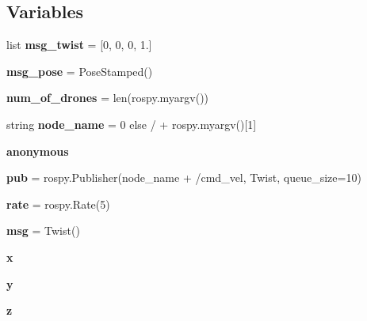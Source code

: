 \subsection*{Variables}
\begin{DoxyCompactItemize}
\item 
\mbox{\label{namespacequadrotor__driver_a0b593d1d89053fdbb65ef11a4523eb77}} 
list {\bfseries msg\+\_\+twist} = \mbox{[}0, 0, 0, 1.\mbox{]}
\item 
\mbox{\label{namespacequadrotor__driver_adfe56e718f228b150e3d4a4654d8d603}} 
{\bfseries msg\+\_\+pose} = Pose\+Stamped()
\item 
\mbox{\label{namespacequadrotor__driver_a33f11d47be5ca142ed1221dad3d6c571}} 
{\bfseries num\+\_\+of\+\_\+drones} = len(rospy.\+myargv())
\item 
\mbox{\label{namespacequadrotor__driver_acf8911932b4f8d86c391901738b5adb9}} 
string {\bfseries node\+\_\+name} = 0 else \textquotesingle{}/\textquotesingle{} + rospy.\+myargv()\mbox{[}1\mbox{]}
\item 
\mbox{\label{namespacequadrotor__driver_a79fc07d997df08f0442ad944e535e70b}} 
{\bfseries anonymous}
\item 
\mbox{\label{namespacequadrotor__driver_a38bc846606197a30453d1452c64737e0}} 
{\bfseries pub} = rospy.\+Publisher(node\+\_\+name + \textquotesingle{}/cmd\+\_\+vel\textquotesingle{}, Twist, queue\+\_\+size=10)
\item 
\mbox{\label{namespacequadrotor__driver_af447179b69c4fa50ec85c7de380f92f5}} 
{\bfseries rate} = rospy.\+Rate(5)
\item 
\mbox{\label{namespacequadrotor__driver_a689bce98055097e8f737e85f56bfee56}} 
{\bfseries msg} = Twist()
\item 
\mbox{\label{namespacequadrotor__driver_a173ac8b7108aa37b58caf78ce4990d5f}} 
{\bfseries x}
\item 
\mbox{\label{namespacequadrotor__driver_aa87127954ea858229dde94266fe069b2}} 
{\bfseries y}
\item 
\mbox{\label{namespacequadrotor__driver_a67068a544ef0fd0fb6496a15d074fd91}} 
{\bfseries z}
\end{DoxyCompactItemize}


